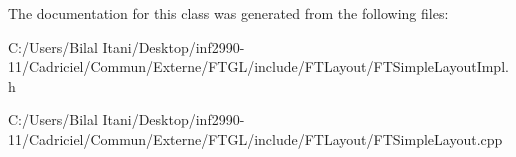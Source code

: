 The documentation for this class was generated from the following files\+:\begin{DoxyCompactItemize}
\item 
C\+:/\+Users/\+Bilal Itani/\+Desktop/inf2990-\/11/\+Cadriciel/\+Commun/\+Externe/\+F\+T\+G\+L/include/\+F\+T\+Layout/F\+T\+Simple\+Layout\+Impl.\+h\item 
C\+:/\+Users/\+Bilal Itani/\+Desktop/inf2990-\/11/\+Cadriciel/\+Commun/\+Externe/\+F\+T\+G\+L/include/\+F\+T\+Layout/F\+T\+Simple\+Layout.\+cpp\end{DoxyCompactItemize}
